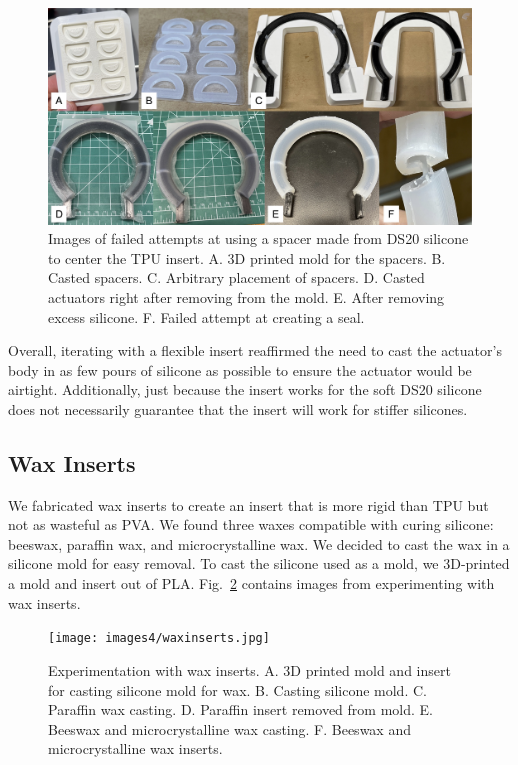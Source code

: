 \begin{figure}[ht!]
    \centering
    \includegraphics[width=5.5 in]{images4/ds20spacer.jpg}
    \caption{Images of failed attempts at using a spacer made from DS20 silicone to center the TPU insert. A. 3D printed mold for the spacers. B. Casted spacers. C. Arbitrary placement of spacers. D. Casted actuators right after removing from the mold. E. After removing excess silicone. F. Failed attempt at creating a seal.}
    \label{fig:ds20spacer}
\end{figure}

Overall, iterating with a flexible insert reaffirmed the need to cast the actuator's body in as few pours of silicone as possible to ensure the actuator would be airtight. Additionally, just because the insert works for the soft DS20 silicone does not necessarily guarantee that the insert will work for stiffer silicones. 

\clearpage
\subsection{Wax Inserts}

We fabricated wax inserts to create an insert that is more rigid than TPU but not as wasteful as PVA. We found three waxes compatible with curing silicone: beeswax, paraffin wax, and microcrystalline wax. We decided to cast the wax in a silicone mold for easy removal. To cast the silicone used as a mold, we 3D-printed a mold and insert out of PLA. Fig.~\ref{fig:waxinserts} contains images from experimenting with wax inserts. 

\begin{figure}[ht!]
    \centering
    \texttt{[image: images4/waxinserts.jpg]}
    \caption{Experimentation with wax inserts. A. 3D printed mold and insert for casting silicone mold for wax. B. Casting silicone mold. C. Paraffin wax casting. D. Paraffin insert removed from mold. E. Beeswax and microcrystalline wax casting. F. Beeswax and microcrystalline wax inserts.}
    \label{fig:waxinserts}
\end{figure}


